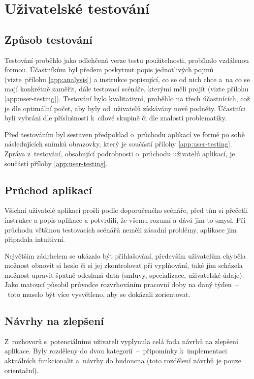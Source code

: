 \documentclass[a4paper,11pt,openany,twoside]{book}
\begin{document}
\chapter{Uživatelské testování}

\section{Způsob testování}
Testování proběhlo jako odlehčená verze testu použitelnosti, probíhalo vzdálenou formou. Účastníkům byl předem poskytnut popis jednotlivých pojmů (vizte~přílohu \ref{app:analysis}) a instrukce popisující, co se od nich chce a~na co se mají konkrétně zaměřit, dále testovací scénáře, kterými měli projít (vizte přílohu \ref{app:user-testing}). Testování bylo kvalitativní, proběhlo na třech účastnících, což je dle \cite{nielsen2000why} optimální počet, aby byly od~uživatelů získávány nové podněty. Účastníci byli vybráni dle příslušnosti k~cílové skupině či dle znalosti problematiky.

Před testováním byl sestaven předpoklad o~průchodu aplikací ve formě po sobě následujících snímků obrazovky, který je součástí přílohy \ref{app:user-testing}. Zpráva z~testování, obsahující podrobnosti o~průchodu uživatelů aplikací, je součástí přílohy \ref{app:user-testing}.

\section{Průchod aplikací}
Všichni uživatelé aplikaci prošli podle doporučeného scénáře, před tím si přečetli instrukce a popis aplikace a potvrdili, že všemu rozumí a dává jim to smysl. Při průchodu většinou testovacích scénářů neměli zásadní problémy, aplikace jim připadala intuitivní.

Největším zádrhelem se ukázalo být přihlašování, především uživatelům chyběla možnost obnovit si heslo či si jej zkontrolovat při vyplňování, také jim scházela možnost upravit špatně odeslaná data (smluvy, specializace, uživatelské údaje). Jako matoucí působil průvodce rozvrhováním pracovní doby na daný týden~–~toto muselo být více vysvětleno, aby se dokázali zorientovat.

\section{Návrhy na zlepšení}
Z~rozhovorů s~potenciálními uživateli vyplynula celá řada návrhů na zlepšení aplikace. Byly rozděleny do dvou kategorií~–~připomínky k~implementaci aktuálních funkcionalit a~návrhy do budoucna (toto rozdělení návrhů je pouze orientační).
\end{document}
